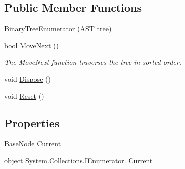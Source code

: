 \subsection*{Public Member Functions}
\begin{DoxyCompactItemize}
\item 
\hyperlink{class_c_p_u___o_s___simulator_1_1_compiler_1_1_frontend_1_1_syntax_tree_1_1_a_s_t_1_1_binary_tree_enumerator_a7daf21f731aae9e9d17d0e72b0161892}{Binary\+Tree\+Enumerator} (\hyperlink{class_c_p_u___o_s___simulator_1_1_compiler_1_1_frontend_1_1_syntax_tree_1_1_a_s_t}{A\+S\+T} tree)
\item 
bool \hyperlink{class_c_p_u___o_s___simulator_1_1_compiler_1_1_frontend_1_1_syntax_tree_1_1_a_s_t_1_1_binary_tree_enumerator_afac74da64083cc8fbb42d684df377fc8}{Move\+Next} ()
\begin{DoxyCompactList}\small\item\em The Move\+Next function traverses the tree in sorted order. \end{DoxyCompactList}\item 
void \hyperlink{class_c_p_u___o_s___simulator_1_1_compiler_1_1_frontend_1_1_syntax_tree_1_1_a_s_t_1_1_binary_tree_enumerator_a60782235f4812bb1d1abfbfe57322b68}{Dispose} ()
\item 
void \hyperlink{class_c_p_u___o_s___simulator_1_1_compiler_1_1_frontend_1_1_syntax_tree_1_1_a_s_t_1_1_binary_tree_enumerator_ae29889b8cee334c4306c6649b2359746}{Reset} ()
\end{DoxyCompactItemize}
\subsection*{Properties}
\begin{DoxyCompactItemize}
\item 
\hyperlink{class_c_p_u___o_s___simulator_1_1_compiler_1_1_frontend_1_1_syntax_tree_1_1_base_node}{Base\+Node} \hyperlink{class_c_p_u___o_s___simulator_1_1_compiler_1_1_frontend_1_1_syntax_tree_1_1_a_s_t_1_1_binary_tree_enumerator_a7dd14bca5195ebc3da5896da3bf31f6c}{Current}
\item 
object System.\+Collections.\+I\+Enumerator. \hyperlink{class_c_p_u___o_s___simulator_1_1_compiler_1_1_frontend_1_1_syntax_tree_1_1_a_s_t_1_1_binary_tree_enumerator_a70bd3883026e363dea982edd307db207}{Current}
\end{DoxyCompactItemize}
